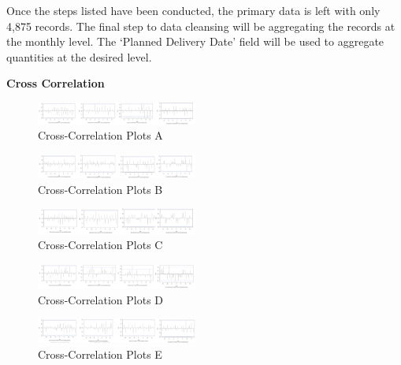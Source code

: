 \documentclass[12pt,oneside]{chicagocapstone}
\begin{document}
Once the steps listed have been conducted, the primary data is left with only 4,875 records. The final step to data cleansing will be aggregating the records at the monthly level. The `Planned Delivery Date' field will be used to aggregate quantities at the desired level.

\textbf{Cross Correlation}
\begin{figure}

{\centering \includegraphics[width=200px,angle = 0, scale=2.5]{figure/ccf1} 

}

\caption{Cross-Correlation Plots A}\label{fig:ccf1}
\end{figure}
\begin{figure}

{\centering \includegraphics[width=200px,angle = 0, scale=2.5]{figure/ccf2} 

}

\caption{Cross-Correlation Plots B}\label{fig:ccf2}
\end{figure}
\begin{figure}

{\centering \includegraphics[width=200px,angle = 0, scale=2.5]{figure/ccf3} 

}

\caption{Cross-Correlation Plots C}\label{fig:ccf3}
\end{figure}
\begin{figure}

{\centering \includegraphics[width=200px,angle = 0, scale=2.5]{figure/ccf4} 

}

\caption{Cross-Correlation Plots D}\label{fig:ccf4}
\end{figure}
\begin{figure}

{\centering \includegraphics[width=200px,angle = 0, scale=2.5]{figure/ccf5} 

}

\caption{Cross-Correlation Plots E}\label{fig:ccf5}
\end{figure}
\end{document}
